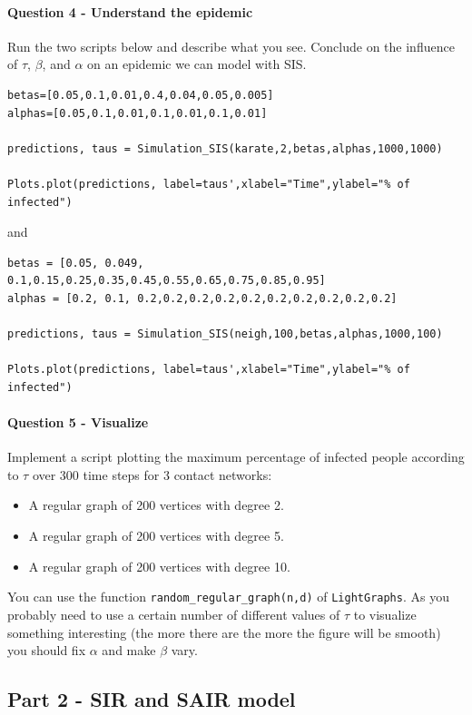 \documentclass{article}
\begin{document}
\paragraph{Question 4 - Understand the epidemic} Run the two scripts below and describe what you see. Conclude on the influence of $\tau$, $\beta$, and $\alpha$ on an epidemic we can model with SIS.

\begin{verbatim}
betas=[0.05,0.1,0.01,0.4,0.04,0.05,0.005]
alphas=[0.05,0.1,0.01,0.1,0.01,0.1,0.01]

predictions, taus = Simulation_SIS(karate,2,betas,alphas,1000,1000)

Plots.plot(predictions, label=taus',xlabel="Time",ylabel="% of infected")
\end{verbatim}

and

\begin{verbatim}
betas = [0.05, 0.049, 0.1,0.15,0.25,0.35,0.45,0.55,0.65,0.75,0.85,0.95]
alphas = [0.2, 0.1, 0.2,0.2,0.2,0.2,0.2,0.2,0.2,0.2,0.2,0.2]

predictions, taus = Simulation_SIS(neigh,100,betas,alphas,1000,100)

Plots.plot(predictions, label=taus',xlabel="Time",ylabel="% of infected")
\end{verbatim}

\paragraph{Question 5 - Visualize} Implement a script plotting the maximum percentage of infected people according to $\tau$ over 300 time steps for 3 contact networks:

\begin{itemize}
    \item A regular graph of 200 vertices with degree 2.
    \item A regular graph of 200 vertices with degree 5.
    \item A regular graph of 200 vertices with degree 10.
\end{itemize}

You can use the function \texttt{random\_regular\_graph(n,d)} of \texttt{LightGraphs}. As you probably need to use a certain number of different values of $\tau$ to visualize something interesting (the more there are the more the figure will be smooth) you should fix $\alpha$ and make $\beta$ vary.

\subsection*{Part 2 - SIR and SAIR model}
\end{document}
